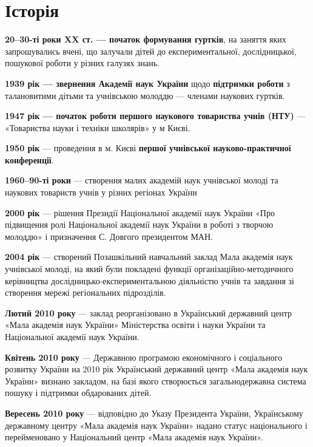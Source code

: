 \documentclass[
  letterpaper,
  DIV=11,
  numbers=noendperiod,
  oneside]{scrartcl}
\begin{document}
\hypertarget{ux456ux441ux442ux43eux440ux456ux44f}{%
\section{Історія}\label{ux456ux441ux442ux43eux440ux456ux44f}}

\textbf{20--30-ті роки XX ст. --- початок формування гуртків}, на
заняття яких запрошувались вчені, що залучали дітей до
експериментальної, дослідницької, пошукової роботи у різних галузях
знань.

\textbf{1939 рік --- звернення Академії наук України} щодо
\textbf{підтримки роботи} з талановитими дітьми та учнівською молоддю
--- членами наукових гуртків.

\textbf{1947 рік --- початок роботи першого наукового товариства учнів
(НТУ)} --- «Товариства науки і техніки школярів» у м Києві.

\textbf{1950 рік} --- проведення в м. Києві \textbf{першої учнівської
науково-практичної конференції}.

\textbf{1960--90-ті роки} --- створення малих академій наук учнівської
молоді та наукових товариств учнів у різних регіонах України

\textbf{2000 рік} --- рішення Президії Національної академії наук
України «Про підвищення ролі Національної академії наук України в роботі
з творчою молоддю» і призначення С. Довгого президентом МАН.

\textbf{2004 рік} --- створений Позашкільний навчальний заклад Мала
академія наук учнівської молоді, на який були покладені функції
організаційно-методичного керівництва дослідницько-експериментальною
діяльністю учнів та завдання зі створення мережі регіональних
підрозділів.

\textbf{Лютий 2010 року} --- заклад реорганізовано в Український
державний центр «Мала академія наук України» Міністерства освіти і науки
України та Національної академії наук України.

\textbf{Квітень 2010 року} --- Державною програмою економічного і
соціального розвитку України на 2010 рік Український державний центр
«Мала академія наук України» визнано закладом, на базі якого створюється
загальнодержавна система пошуку і підтримки обдарованих дітей.

\textbf{Вересень 2010 року} --- відповідно до Указу Президента України,
Українському державному центру «Мала академія наук України» надано
статус національного і перейменовано у Національний центр «Мала академія
наук України».
\end{document}
